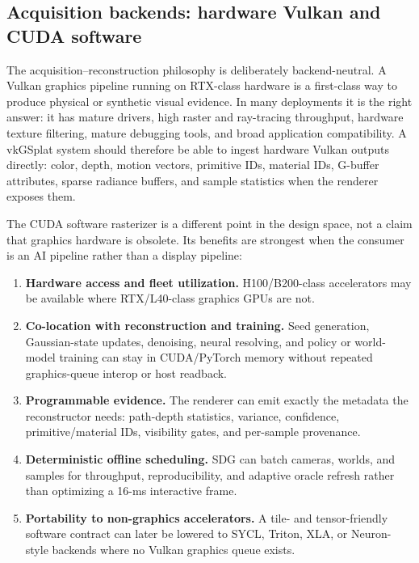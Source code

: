 \documentclass[10pt,journal,onecolumn]{IEEEtran}
\begin{document}
\subsection{Acquisition backends: hardware Vulkan and CUDA software}
\label{sec:acquisition-backends}

The acquisition--reconstruction philosophy is deliberately backend-neutral. A
Vulkan graphics pipeline running on RTX-class hardware is a first-class way to
produce physical or synthetic visual evidence. In many deployments it is the
right answer: it has mature drivers, high raster and ray-tracing throughput,
hardware texture filtering, mature debugging tools, and broad application
compatibility. A vkGSplat system should therefore be able to ingest hardware
Vulkan outputs directly: color, depth, motion vectors, primitive IDs, material
IDs, G-buffer attributes, sparse radiance buffers, and sample statistics when the
renderer exposes them.

The CUDA software rasterizer is a different point in the design space, not a
claim that graphics hardware is obsolete. Its benefits are strongest when the
consumer is an AI pipeline rather than a display pipeline:
\begin{enumerate}
  \item \textbf{Hardware access and fleet utilization.} H100/B200-class
        accelerators may be available where RTX/L40-class graphics GPUs are not.
  \item \textbf{Co-location with reconstruction and training.} Seed generation,
        Gaussian-state updates, denoising, neural resolving, and policy or
        world-model training can stay in CUDA/PyTorch memory without repeated
        graphics-queue interop or host readback.
  \item \textbf{Programmable evidence.} The renderer can emit exactly the
        metadata the reconstructor needs: path-depth statistics, variance,
        confidence, primitive/material IDs, visibility gates, and per-sample
        provenance.
  \item \textbf{Deterministic offline scheduling.} SDG can batch cameras,
        worlds, and samples for throughput, reproducibility, and adaptive oracle
        refresh rather than optimizing a 16-ms interactive frame.
  \item \textbf{Portability to non-graphics accelerators.} A tile- and
        tensor-friendly software contract can later be lowered to SYCL, Triton,
        XLA, or Neuron-style backends where no Vulkan graphics queue exists.
\end{enumerate}
\end{document}
